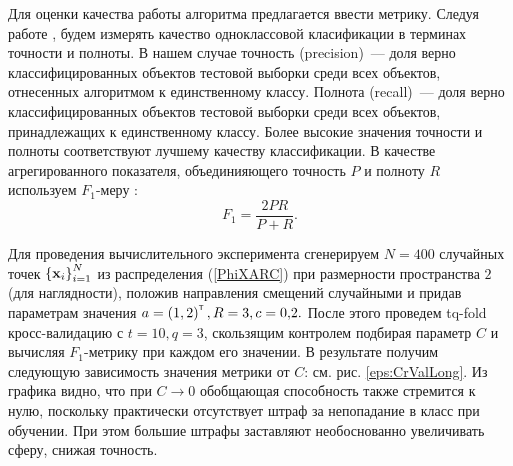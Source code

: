 Для оценки качества работы алгоритма предлагается ввести метрику. 
Следуя работе  \cite{Romanenko2012}, будем измерять качество одноклассовой класификации в терминах точности и полноты. 
В нашем случае точность (precision)~--- доля верно классифицированных объектов тестовой выборки среди всех объектов, отнесенных алгоритмом к единственному классу. 
Полнота (recall)~--- доля верно классифицированных объектов тестовой выборки среди всех объектов, принадлежащих к единственному классу. 
Более высокие значения точности и полноты соответствуют лучшему качеству классификации. 
В качестве агрегированного показателя, объединияющего точность $P$ и полноту $R$ используем $F_1$-меру \cite{Rijsbergen1979}:
$$F_1 = \frac{2PR}{P+R}.$$

Для проведения вычислительного эксперимента сгенерируем $N=400$ случайных точек $\left\{\boldsymbol{\mathbf{x}}_i\right\}_{i=1}^N$ из распределения (\ref{PhiXARC}) при размерности пространства $2$ (для наглядности), положив направления смещений случайными и придав параметрам значения $a = \left(1,2\right)^{\text{\tiny\sffamily\upshape\mdseries T}}, R = 3, c = 0{,}2.$
После этого проведем tq-fold кросс-валидацию с $t = 10, q = 3$, скользящим контролем подбирая параметр $C$ и вычисляя $F_1$-метрику при каждом его значении. 
В результате получим следующую зависимость значения метрики от $C$: см. рис. \ref{eps:CrValLong}.
Из графика видно, что при $C\to 0$ обобщающая способность также стремится к нулю, поскольку практически отсутствует штраф за непопадание в класс при обучении. 
При этом большие штрафы заставляют необоснованно увеличивать сферу, снижая точность.

